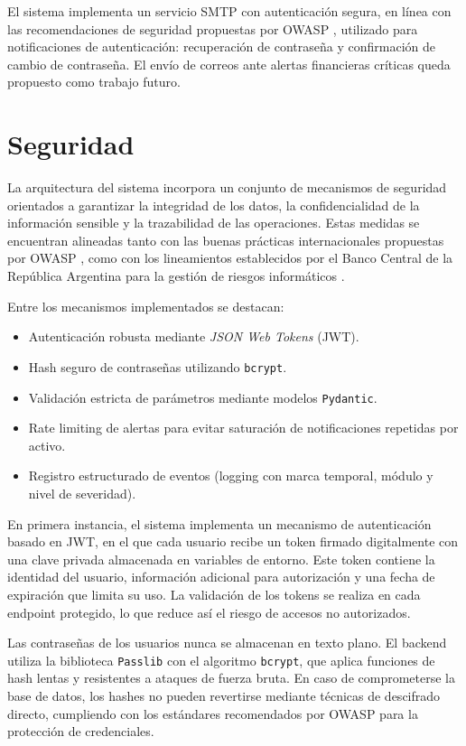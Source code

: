 El sistema implementa un servicio SMTP con autenticación segura, en línea con las
  recomendaciones de seguridad propuestas por OWASP \parencite{owasp2021}, utilizado
  para notificaciones de autenticación: recuperación de contraseña y confirmación de
  cambio de contraseña. El envío de correos ante alertas financieras críticas queda
  propuesto como trabajo futuro.

\section{Seguridad}

 La arquitectura del sistema incorpora un conjunto de mecanismos de seguridad
  orientados a garantizar la integridad de los datos, la confidencialidad de la
  información sensible y la trazabilidad de las operaciones. Estas medidas se
  encuentran alineadas tanto con las buenas prácticas internacionales propuestas
  por OWASP \parencite{owasp2021}, como con los lineamientos establecidos por el
  Banco Central de la República Argentina para la gestión de riesgos informáticos
  \parencite{bcra7724}.

  Entre los mecanismos implementados se destacan:

  \begin{itemize}
      \item Autenticación robusta mediante \textit{JSON Web Tokens} (JWT).
      \item Hash seguro de contraseñas utilizando \texttt{bcrypt}.
      \item Validación estricta de parámetros mediante modelos \texttt{Pydantic}.
      \item Rate limiting de alertas para evitar saturación de notificaciones repetidas por   
  activo.
      \item Registro estructurado de eventos (logging con marca temporal, módulo y nivel de   
  severidad).
  \end{itemize}

  En primera instancia, el sistema implementa un mecanismo de autenticación basado
  en JWT, en el que cada usuario recibe un token firmado digitalmente con una clave
  privada almacenada en variables de entorno. Este token contiene la identidad del
  usuario, información adicional para autorización y una fecha de expiración que
  limita su uso. La validación de los tokens se realiza en cada endpoint protegido,
  lo que reduce así el riesgo de accesos no autorizados.

  Las contraseñas de los usuarios nunca se almacenan en texto plano. El backend
  utiliza la biblioteca \texttt{Passlib} con el algoritmo \texttt{bcrypt}, que
  aplica funciones de hash lentas y resistentes a ataques de fuerza bruta. En caso
  de comprometerse la base de datos, los hashes no pueden revertirse mediante
  técnicas de descifrado directo, cumpliendo con los estándares recomendados por
  OWASP para la protección de credenciales.

